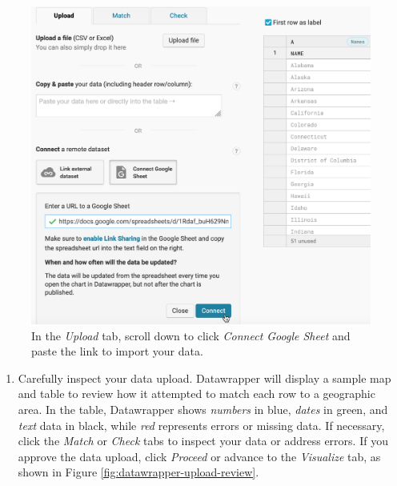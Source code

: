 \documentclass[
  english,
]{book}
\providecommand{\tightlist}{%
  \setlength{\itemsep}{0pt}\setlength{\parskip}{0pt}}
\begin{document}
\begin{figure}
\includegraphics[width=600px]{images/07-map/datawrapper-upload-google-sheet} \caption{In the \emph{Upload} tab, scroll down to click \emph{Connect Google Sheet} and paste the link to import your data.}\label{fig:datawrapper-upload-google-sheet}
\end{figure}

\begin{enumerate}
\def\labelenumi{\arabic{enumi}.}
\setcounter{enumi}{5}
\tightlist
\item
  Carefully inspect your data upload. Datawrapper will display a sample map and table to review how it attempted to match each row to a geographic area. In the table, Datawrapper shows \emph{numbers} in blue, \emph{dates} in green, and \emph{text} data in black, while \emph{red} represents errors or missing data. If necessary, click the \emph{Match} or \emph{Check} tabs to inspect your data or address errors. If you approve the data upload, click \emph{Proceed} or advance to the \emph{Visualize} tab, as shown in Figure \ref{fig:datawrapper-upload-review}.
\end{enumerate}
\end{document}
